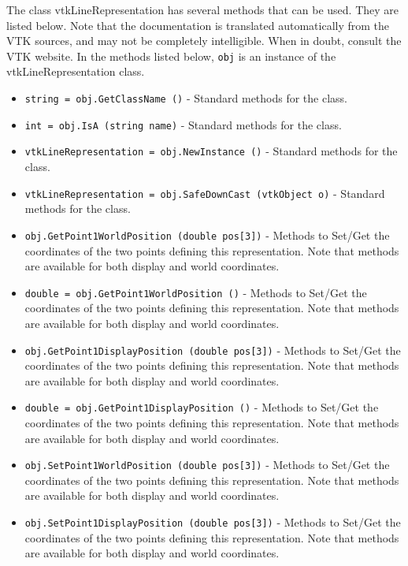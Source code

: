 The class vtkLineRepresentation has several methods that can be used.
  They are listed below.
Note that the documentation is translated automatically from the VTK sources,
and may not be completely intelligible.  When in doubt, consult the VTK website.
In the methods listed below, \verb|obj| is an instance of the vtkLineRepresentation class.
\begin{itemize}
\item  \verb|string = obj.GetClassName ()| -  Standard methods for the class.

\item  \verb|int = obj.IsA (string name)| -  Standard methods for the class.

\item  \verb|vtkLineRepresentation = obj.NewInstance ()| -  Standard methods for the class.

\item  \verb|vtkLineRepresentation = obj.SafeDownCast (vtkObject o)| -  Standard methods for the class.

\item  \verb|obj.GetPoint1WorldPosition (double pos[3])| -  Methods to Set/Get the coordinates of the two points defining
 this representation. Note that methods are available for both
 display and world coordinates.

\item  \verb|double = obj.GetPoint1WorldPosition ()| -  Methods to Set/Get the coordinates of the two points defining
 this representation. Note that methods are available for both
 display and world coordinates.

\item  \verb|obj.GetPoint1DisplayPosition (double pos[3])| -  Methods to Set/Get the coordinates of the two points defining
 this representation. Note that methods are available for both
 display and world coordinates.

\item  \verb|double = obj.GetPoint1DisplayPosition ()| -  Methods to Set/Get the coordinates of the two points defining
 this representation. Note that methods are available for both
 display and world coordinates.

\item  \verb|obj.SetPoint1WorldPosition (double pos[3])| -  Methods to Set/Get the coordinates of the two points defining
 this representation. Note that methods are available for both
 display and world coordinates.

\item  \verb|obj.SetPoint1DisplayPosition (double pos[3])| -  Methods to Set/Get the coordinates of the two points defining
 this representation. Note that methods are available for both
 display and world coordinates.


\end{itemize}
